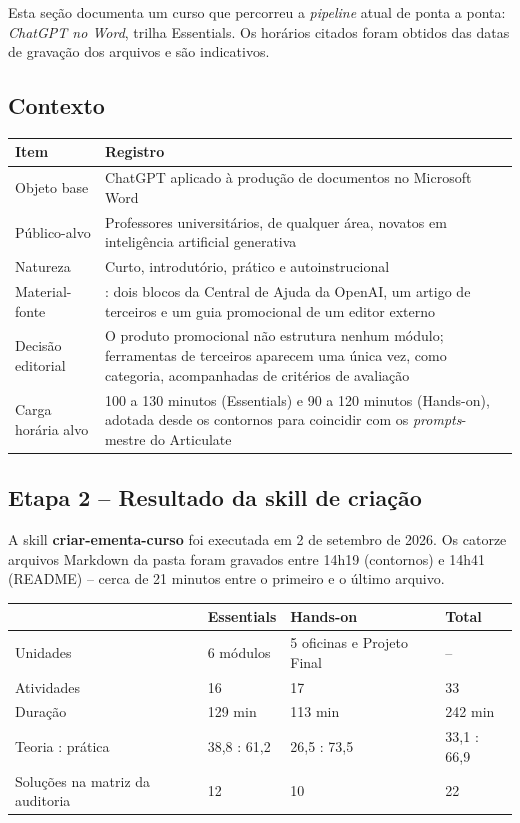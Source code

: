 \documentclass[12pt,a4paper]{article}
\newcommand{\skill}[1]{\textsf{\textbf{#1}}}
\begin{document}
Esta seção documenta um curso que percorreu a \textit{pipeline} atual de ponta a ponta: \textit{ChatGPT no Word}, trilha Essentials. Os horários citados foram obtidos das datas de gravação dos arquivos e são indicativos.

\subsection{Contexto}

\begingroup\small
\renewcommand{\arraystretch}{1.3}
\begin{longtable}{@{}L{0.26\textwidth}L{0.68\textwidth}@{}}
\toprule
\textbf{Item} & \textbf{Registro} \\
\midrule
\endhead
Objeto base & ChatGPT aplicado à produção de documentos no Microsoft Word \\
Público-alvo & Professores universitários, de qualquer área, novatos em inteligência artificial generativa \\
Natureza & Curto, introdutório, prático e autoinstrucional \\
Material-fonte & : dois blocos da Central de Ajuda da OpenAI, um artigo de terceiros e um guia promocional de um editor externo \\
Decisão editorial & O produto promocional não estrutura nenhum módulo; ferramentas de terceiros aparecem uma única vez, como categoria, acompanhadas de critérios de avaliação \\
Carga horária alvo & 100 a 130 minutos (Essentials) e 90 a 120 minutos (Hands-on), adotada desde os contornos para coincidir com os \textit{prompts}-mestre do Articulate \\
\bottomrule
\end{longtable}
\endgroup

\subsection{Etapa 2 -- Resultado da skill de criação}

A skill \skill{criar-ementa-curso} foi executada em 2 de setembro de 2026. Os catorze arquivos Markdown da pasta  foram gravados entre 14h19 (contornos) e 14h41 (README) -- cerca de 21 minutos entre o primeiro e o último arquivo.

\begingroup\small
\renewcommand{\arraystretch}{1.3}
\begin{longtable}{@{}L{0.34\textwidth}L{0.19\textwidth}L{0.23\textwidth}L{0.14\textwidth}@{}}
\toprule
 & \textbf{Essentials} & \textbf{Hands-on} & \textbf{Total} \\
\midrule
\endhead
Unidades & 6 módulos & 5 oficinas e Projeto Final & -- \\
Atividades & 16 & 17 & 33 \\
Duração & 129 min & 113 min & 242 min \\
Teoria : prática & 38,8 : 61,2 & 26,5 : 73,5 & 33,1 : 66,9 \\
Soluções na matriz da auditoria & 12 & 10 & 22 \\
\bottomrule
\end{longtable}
\endgroup
\end{document}
